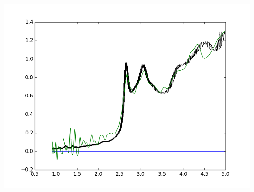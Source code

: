 \documentclass{article}
\begin{document}
\includegraphics{"(7,4) APTE DNA Paper.png"}
\end{document}
